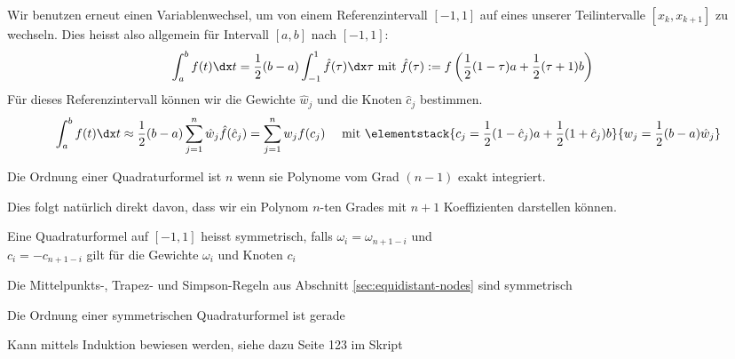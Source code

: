 Wir benutzen erneut einen Variablenwechsel, um von einem Referenzintervall $[-1, 1]$ auf eines unserer Teilintervalle $[x_k, x_{k + 1}]$ zu wechseln.
Dies heisst also allgemein für Intervall $[a, b]$ nach $[-1, 1]$:
\begin{align*}
    \int_{a}^{b} f(t) \dx t = \frac{1}{2} (b - a) \int_{-1}^{1} \hat{f}(\tau) \dx \tau & \text{ mit } \hat{f}(\tau) := f\left( \frac{1}{2}(1 - \tau) a + \frac{1}{2}(\tau + 1) b \right)
\end{align*}
Für dieses Referenzintervall können wir die Gewichte $\hat{w}_j$ und die Knoten $\hat{c}_j$ bestimmen.
\rmvspace
\begin{align*}
    \int_{a}^{b} f(t) \dx t \approx \frac{1}{2}(b - a) \sum_{j = 1}^{n} \hat{w}_j \hat{f}(\hat{c}_j) = \sum_{j = 1}^{n} w_j f(c_j)
     &  & \text{ mit } \elementstack{c_j = \frac{1}{2} (1 - \hat{c}_j) a + \frac{1}{2}(1 + \hat{c}_j) b}{w_j = \frac{1}{2}(b - a)\hat{w}_j}
\end{align*}

\rmvspace\rmvspace
\inlinedef Die Ordnung einer Quadraturformel ist $n$ wenn sie Polynome vom Grad $(n - 1)$ exakt integriert.

Dies folgt natürlich direkt davon, dass wir ein Polynom $n$-ten Grades mit $n + 1$ Koeffizienten darstellen können.

 Eine Quadraturformel auf $[-1, 1]$ heisst symmetrisch, falls $\omega_i = \omega_{n + 1 - i}$ und \\
$c_i = -c_{n + 1 -i}$ gilt für die Gewichte $\omega_i$ und Knoten $c_i$

\inlineremark Die Mittelpunkts-, Trapez- und Simpson-Regeln aus Abschnitt \ref{sec:equidistant-nodes} sind symmetrisch

\inlinetheorem Die Ordnung einer symmetrischen Quadraturformel ist gerade

\inlineproof Kann mittels Induktion bewiesen werden, siehe dazu Seite 123 im Skript
